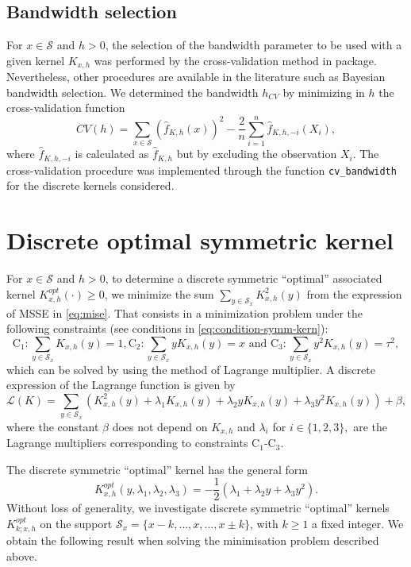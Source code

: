 \subsection{Bandwidth selection}\label{bandwidth-selection}

For \(x\in \mathcal{S}\) and \(h>0\), the selection of the bandwidth parameter to be used with a given kernel \(K_{x,h}\) was performed by the cross-validation method in  package. Nevertheless, other procedures are available in the literature such as Bayesian bandwidth selection. We determined the bandwidth \(h_{CV}\) by minimizing in \(h\) the cross-validation function
\begin{equation*}
   CV(h)= \sum_{x\in\mathcal{S}}\left (\widehat{f}_{K,h}(x)\right )^{2} -\frac{2}{n}\sum_{i=1}^{n}\widehat{f}_{K,h,-i}(X_{i}),
\end{equation*}
where \(\widehat{f}_{K,h,-i}\) is calculated as \(\widehat{f}_{K,h}\) but by excluding the observation \(X_{i}\). The cross-validation procedure was implemented through the function \texttt{cv\_bandwidth} for the discrete kernels considered.

\section{Discrete optimal symmetric kernel}\label{sec3-optimal-kernel}

For \(x \in \mathcal{S}\) and \(h>0\), to determine a discrete symmetric ``optimal'' associated kernel \(K_{x,h}^{opt}(\cdot)\geq0\), we minimize the sum \(\sum_{y\in\mathcal{S}_{x}}K^{2}_{x,h}(y)\) from the expression of MSSE in \eqref{eq:mise}. That consists in a minimization problem under the following constraints (see conditions in \eqref{eq:condition-symm-kern}):
\[\text{C}_{1}:\sum_{y\in\mathcal{S}_{x}}K_{x,h}(y)=1,  \text{C}_{2}:\sum_{y\in\mathcal{S}_{x}}yK_{x,h}(y)=x \text{ and  }\text{C}_{3}:\sum_{y\in\mathcal{S}_{x}}y^{2}K_{x,h}(y)=\tau^{2}, \]
which can be solved by using the method of Lagrange multiplier. A discrete expression of the Lagrange function is given by
\[\mathcal{L}(K)= \sum_{y\in\mathcal{S}_{x}}\left (K_{x,h}^{2}(y) + \lambda_{1} K_{x,h}(y)+ \lambda_{2}yK_{x,h}(y)+ \lambda_{3}y^{2}K_{x,h}(y)\right )+ \beta,\]
where the constant \(\beta\) does not depend on \(K_{x,h}\) and \(\lambda_{i}\) for \(i\in \{1,2,3\},\) are the Lagrange multipliers corresponding to constraints C\(_1\)-C\(_3\).

The discrete symmetric ``optimal'' kernel has the general form
\begin{equation*}\label{eq:Kh_opt}
K_{x,h}^{opt}(y,\lambda_{1},\lambda_{2},\lambda_{3})=-\frac{1}{2}(\lambda_{1} +\lambda_{2}y+\lambda_{3}y^{2}).  
\end{equation*}
Without loss of generality, we investigate discrete symmetric ``optimal'' kernels \(K_{k;x,h}^{opt}\) on the support \(\mathcal{S}_{x}=\{x-k,\ldots,x,\ldots,x\pm k\}\), with \(k\geq1\) a fixed integer. We obtain the following result when solving the minimisation problem described above.

